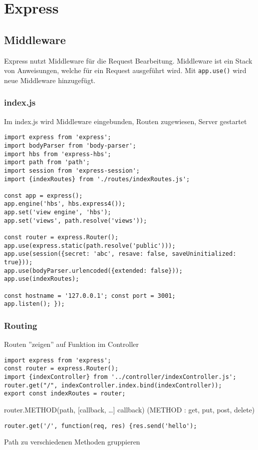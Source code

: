 
\section{Express}

\subsection{Middleware}
Express nutzt Middleware für die Request Bearbeitung. Middleware ist ein Stack von Anweisungen, welche für ein Request ausgeführt wird. Mit \texttt{app.use()} wird neue Middleware hinzugefügt.

\subsubsection{index.js}
Im index.js wird Middleware eingebunden, Routen zugewiesen, Server gestartet
\begin{lstlisting}
import express from 'express';
import bodyParser from 'body-parser';
import hbs from 'express-hbs';
import path from 'path';
import session from 'express-session';
import {indexRoutes} from './routes/indexRoutes.js';

const app = express();
app.engine('hbs', hbs.express4());
app.set('view engine', 'hbs');
app.set('views', path.resolve('views'));

const router = express.Router();
app.use(express.static(path.resolve('public')));
app.use(session({secret: 'abc', resave: false, saveUninitialized: true}));
app.use(bodyParser.urlencoded({extended: false}));
app.use(indexRoutes);

const hostname = '127.0.0.1'; const port = 3001;
app.listen(); });
\end{lstlisting}

\subsubsection{Routing}
Routen ''zeigen'' auf Funktion im Controller
\begin{lstlisting}
import express from 'express';
const router = express.Router();
import {indexController} from '../controller/indexController.js';
router.get("/", indexController.index.bind(indexController));
export const indexRoutes = router;
\end{lstlisting}
router.METHOD(path, [callback, \dots ] callback)  (METHOD : get, put, post, delete)
\begin{lstlisting}
router.get('/', function(req, res) {res.send('hello');
\end{lstlisting}
Path zu verschiedenen Methoden gruppieren

